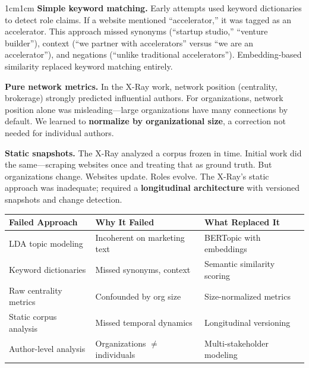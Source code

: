 \documentclass[../main.tex]{subfiles}
\begin{document}
\begin{adjustwidth}{1cm}{1cm}
\noindent\textbf{Simple keyword matching.} Early attempts used keyword dictionaries to detect role claims. If a website mentioned ``accelerator,'' it was tagged as an accelerator. This approach missed synonyms (``startup studio,'' ``venture builder''), context (``we partner with accelerators'' versus ``we are an accelerator''), and negations (``unlike traditional accelerators''). Embedding-based similarity replaced keyword matching entirely.

\noindent\textbf{Pure network metrics.} In the X-Ray work, network position (centrality, brokerage) strongly predicted influential authors. For organizations, network position alone was misleading---large organizations have many connections by default. We learned to \textbf{normalize by organizational size}, a correction not needed for individual authors.

\noindent\textbf{Static snapshots.} The X-Ray analyzed a corpus frozen in time. Initial \RoleBox work did the same---scraping websites once and treating that as ground truth. But organizations change. Websites update. Roles evolve. The X-Ray's static approach was inadequate; \RoleBox required a \textbf{longitudinal architecture} with versioned snapshots and change detection.

\begin{center}
\small
\begin{tabular}{@{}p{3.5cm}p{3.5cm}p{4cm}@{}}
\toprule
\textbf{Failed Approach} & \textbf{Why It Failed} & \textbf{What Replaced It} \\
\midrule
LDA topic modeling & Incoherent on marketing text & BERTopic with embeddings \\
\addlinespace
Keyword dictionaries & Missed synonyms, context & Semantic similarity scoring \\
\addlinespace
Raw centrality metrics & Confounded by org size & Size-normalized metrics \\
\addlinespace
Static corpus analysis & Missed temporal dynamics & Longitudinal versioning \\
\addlinespace
Author-level analysis & Organizations $\neq$ individuals & Multi-stakeholder modeling \\
\bottomrule
\end{tabular}
\label{tab:xray-failures}
\end{center}



\end{adjustwidth}
\end{document}
